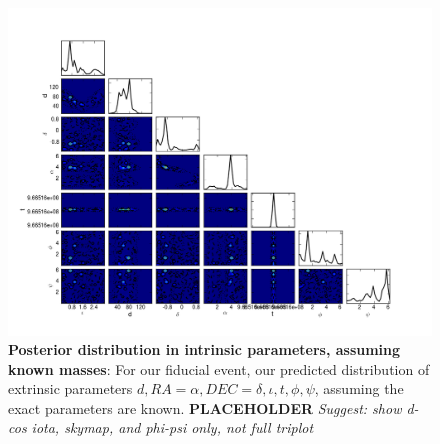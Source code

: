 \documentclass[twocolumn,prd,nofootinbib]{revtex4}
\begin{document}
\begin{figure}
\includegraphics[width=\textwidth]{../Figures/ILE_MASS_SET_0-triplot}
\caption{\textbf{Posterior distribution in intrinsic parameters, assuming known masses}: For our fiducial event, our predicted
  distribution of extrinsic parameters $d,RA=\alpha,DEC=\delta,\iota,t,\phi,\psi$, assuming the exact parameters are
  known.    \textbf{PLACEHOLDER} \emph{Suggest: show d-cos iota, skymap, and phi-psi only, not full triplot}
}
\end{figure}
\end{document}
